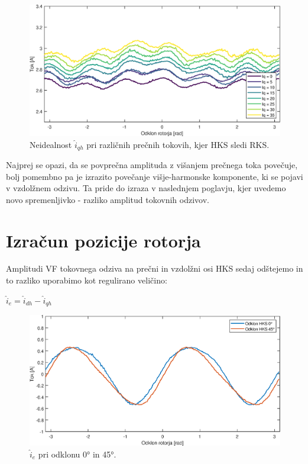 \documentclass[a4paper,twoside,openright,12pt,slovene]{book}
\begin{document}
\begin{figure}[!htbp]
    \centering
    \includegraphics[width=0.95\columnwidth]{Slike/tokovniOdzivIs_HKSslediRKS_IqAmp.eps}
    \caption{\label{tokovniOdzivIs_HKSslediRKS_IqAmp} Neidealnost $\hat{i}_{qh}$ pri različnih prečnih tokovih, kjer HKS sledi RKS.}
\end{figure}

Najprej se opazi, da se povprečna amplituda z višanjem prečnega toka povečuje, bolj pomembno pa je izrazito povečanje višje-harmonske komponente, ki se pojavi v vzdolžnem odzivu. Ta pride do izraza v
naslednjem poglavju, kjer uvedemo novo spremenljivko - razliko amplitud tokovnih odzivov.

\section{Izračun pozicije rotorja}

Amplitudi VF tokovnega odziva na prečni in vzdolžni osi HKS sedaj odštejemo in to razliko uporabimo kot regulirano veličino:

\begin{center}
    $\hat{i}_{e} = \hat{i}_{dh} - \hat{i}_{qh}$
\end{center}

\begin{figure}[!htbp]
    \centering
    \includegraphics[width=1\columnwidth]{Slike/reguliranaVelicinaIdq0.eps}
    \caption{\label{reguliranaVelicinaIdq0} $\hat{i}_{e}$ pri odklonu 0° in 45°.}
\end{figure}
\end{document}
